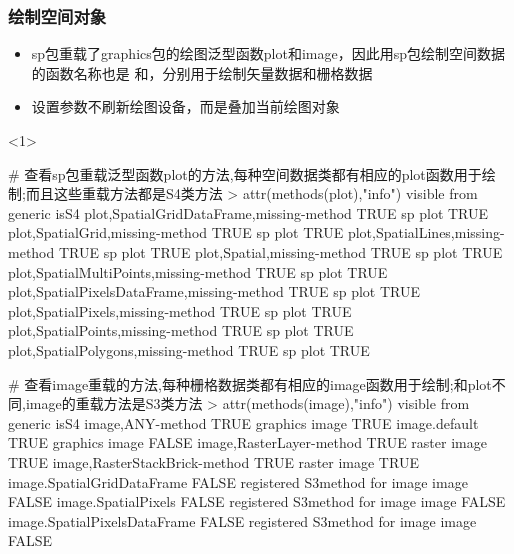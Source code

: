 \subsubsection{绘制空间对象}
\begin{frame}[t,fragile]{\subsecname}{\subsubsecname}
\begin{itemize} 
\item<1-> sp包重载了graphics包的绘图泛型函数plot和image，因此用sp包绘制空间数据的函数名称也是
和，分别用于绘制矢量数据和栅格数据
\item<3-> 设置参数不刷新绘图设备，而是叠加当前绘图对象
\end{itemize}

\begin{overlayarea}{\textwidth}{\textheight}
\begin{onlyenv}<1>
\begin{rcode}
# 查看sp包重载泛型函数plot的方法,每种空间数据类都有相应的plot函数用于绘制;而且这些重载方法都是S4类方法
> attr(methods(plot),"info")
                                           visible  from  generic  isS4  
plot,SpatialGridDataFrame,missing-method      TRUE    sp  plot     TRUE 
plot,SpatialGrid,missing-method               TRUE    sp  plot     TRUE
plot,SpatialLines,missing-method              TRUE    sp  plot     TRUE
plot,Spatial,missing-method                   TRUE    sp  plot     TRUE
plot,SpatialMultiPoints,missing-method        TRUE    sp  plot     TRUE
plot,SpatialPixelsDataFrame,missing-method    TRUE    sp  plot     TRUE
plot,SpatialPixels,missing-method             TRUE    sp  plot     TRUE
plot,SpatialPoints,missing-method             TRUE    sp  plot     TRUE
plot,SpatialPolygons,missing-method           TRUE    sp  plot     TRUE

# 查看image重载的方法,每种栅格数据类都有相应的image函数用于绘制;和plot不同,image的重载方法是S3类方法
> attr(methods(image),"info")
                              visible                          from generic  isS4
image,ANY-method                 TRUE                      graphics   image  TRUE
image.default                    TRUE                      graphics   image FALSE
image,RasterLayer-method         TRUE                        raster   image  TRUE
image,RasterStackBrick-method    TRUE                        raster   image  TRUE
image.SpatialGridDataFrame      FALSE registered S3method for image   image FALSE
image.SpatialPixels             FALSE registered S3method for image   image FALSE
image.SpatialPixelsDataFrame    FALSE registered S3method for image   image FALSE
\end{rcode}
\end{onlyenv}


\end{overlayarea}
\end{frame}

